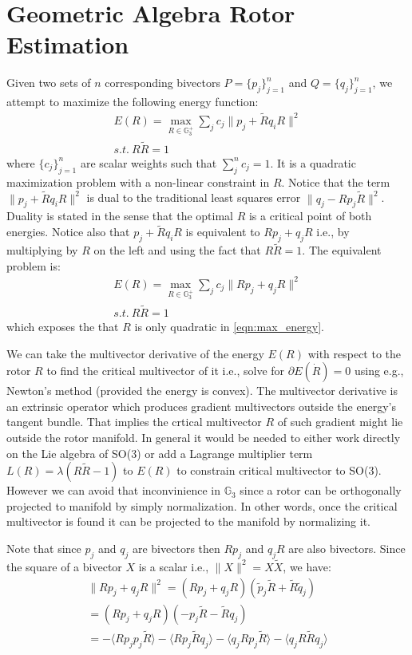 \documentclass{birkjour}
\numberwithin{equation}{section}
\begin{document}
\section{Geometric Algebra Rotor Estimation}

Given two sets of $n$ corresponding bivectors $P = \{p_j\}_{j=1}^n$ and $Q = \{q_j\}_{j=1}^n$, we attempt to maximize the following energy function:
\begin{eqnarray}
	E(R) = \max_{R \in \mathbb{G}^{+}_3 } \sum_j { c_{j} \|p_j + \tilde R q_i R \|^2 }\\
	s.t. \ R \tilde R = 1 \nonumber
\end{eqnarray}
where $\{c_{j}\}_{j=1}^n$ are scalar weights such that $\sum_j^n{c_j} = 1$. It is a quadratic maximization problem with a non-linear constraint in $R$. Notice that the term $\|p_j + \tilde R q_i R\|^2$ is dual to the traditional least squares error $\|q_j - R p_j \tilde R\|^2$. Duality is stated in the sense that the optimal $R$ is a critical point of both energies.
Notice also that $p_j + \tilde R q_i R$ is equivalent to $R p_j + q_j R$ i.e., by multiplying by $R$ on the left and using the fact that $R \tilde R = 1$. The equivalent problem is:
\begin{eqnarray}
	\label{eqn:max_energy}
	E(R) = \max_{R \in \mathbb{G}^{+}_3 } \sum_j { c_{j} \|R p_j + q_j R\|^2 }\\
	s.t. \ R \tilde R = 1 \nonumber
\end{eqnarray}
which exposes the that $R$ is only quadratic in \ref{eqn:max_energy}.

We can take the multivector derivative of the energy $E(R)$ with respect to the rotor $R$ to find the critical multivector of it i.e., solve for $\partial E(\dot R) = 0$ using e.g., Newton's method (provided the energy is convex). The multivector derivative is an extrinsic operator which produces gradient multivectors outside the energy's tangent bundle. That implies the crtical multivector $R$ of such gradient might lie outside the rotor manifold. In general it would be needed to either work directly on the Lie algebra of SO($3$) or add a Lagrange multiplier term $L(R) = \lambda (R \tilde R - 1)$ to $E(R)$ to constrain critical multivector to SO($3$). However we can avoid that inconvinience in $\mathbb{G}_3$ since a rotor can be orthogonally projected to manifold by simply normalization. In other words, once the critical multivector is found it can be projected to the manifold by normalizing it.

Note that since $p_j$ and $q_j$ are bivectors then $R p_j$ and $q_j R$ are also bivectors. Since the square of a bivector $X$ is a scalar i.e., $\|X\|^2 = X \tilde X$, we have:
\begin{eqnarray}
	\|R p_j + q_j R\|^2 = (R p_j + q_j R)(\tilde p_j \tilde R + \tilde R \tilde q_j) \nonumber\\
	= (R p_j + q_j R)(- p_j \tilde R - \tilde R q_j) \nonumber\\
	= -\langle R p_j p_j \tilde R\rangle - \langle R p_j \tilde R q_j\rangle - \langle q_j R p_j \tilde R\rangle - \langle q_j R \tilde R q_j\rangle \nonumber
\end{eqnarray}
\end{document}
